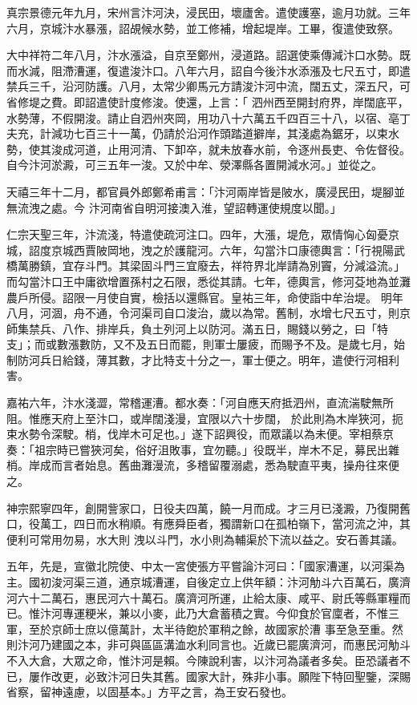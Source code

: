 \begin{pinyinscope}
 真宗景德元年九月，宋州言汴河決，浸民田，壞廬舍。遣使護塞，逾月功就。三年六月，京城汴水暴漲，詔覘候水勢，並工修補，增起堤岸。工畢，復遣使致祭。



 大中祥符二年八月，汴水漲溢，自京至鄭州，浸道路。詔選使乘傳減汴口水勢。既而水減，阻滯漕運，復遣浚汴口。八年六月，詔自今後汴水添漲及七尺五寸，即遣禁兵三千，沿河防護。八月，太常少卿馬元方請浚汴河中流，闊五丈，深五尺，可省修堤之費。即詔遣使計度修浚。使還，上言：「
 泗州西至開封府界，岸闊底平，水勢薄，不假開浚。請止自泗州夾岡，用功八十六萬五千四百三十八，以宿、亳丁夫充，計減功七百三十一萬，仍請於沿河作頭踏道擗岸，其淺處為鋸牙，以束水勢，使其浚成河道，止用河清、下卸卒，就未放春水前，令逐州長吏、令佐督役。自今汴河淤澱，可三五年一浚。又於中牟、滎澤縣各置開減水河。」並從之。



 天禧三年十二月，都官員外郎鄭希甫言：「汴河兩岸皆是陂水，廣浸民田，堤腳並無流洩之處。今
 汴河南省自明河接澳入淮，望詔轉運使規度以聞。」



 仁宗天聖三年，汴流淺，特遣使疏河注口。四年，大漲，堤危，眾情恟心匈憂京城，詔度京城西賈陂岡地，洩之於護龍河。六年，勾當汴口康德輿言：「行視陽武橋萬勝鎮，宜存斗門。其梁固斗門三宜廢去，祥符界北岸請為別竇，分減溢流。」而勾當汴口王中庸欲增置孫村之石限，悉從其請。七年，德輿言，修河芟地為並灘農戶所侵。詔限一月使自實，檢括以還縣官。皇祐三年，命使詣中牟治堤。
 明年八月，河涸，舟不通，令河渠司自口浚治，歲以為常。舊制，水增七尺五寸，則京師集禁兵、八作、排岸兵，負土列河上以防河。滿五日，賜錢以勞之，曰「特支」；而或數漲數防，又不及五日而罷，則軍士屢疲，而賜予不及。是歲七月，始制防河兵日給錢，薄其數，才比特支十分之一，軍士便之。明年，遣使行河相利害。



 嘉祐六年，汴水淺澀，常稽運漕。都水奏：「河自應天府抵泗州，直流湍駛無所阻。惟應天府上至汴口，或岸闊淺漫，宜限以六十步闊，
 於此則為木岸狹河，扼束水勢令深駛。梢，伐岸木可足也。」遂下詔興役，而眾議以為未便。宰相蔡京奏：「祖宗時已嘗狹河矣，俗好沮敗事，宜勿聽。」役既半，岸木不足，募民出雜梢。岸成而言者始息。舊曲灘漫流，多稽留覆溺處，悉為駛直平夷，操舟往來便之。



 神宗熙寧四年，創開訾家口，日役夫四萬，饒一月而成。才三月已淺澱，乃復開舊口，役萬工，四日而水稍順。有應舜臣者，獨謂新口在孤柏嶺下，當河流之沖，其便利可常用勿易，水大則
 洩以斗門，水小則為輔渠於下流以益之。安石善其議。



 五年，先是，宣徽北院使、中太一宮使張方平嘗論汴河曰：「國家漕運，以河渠為主。國初浚河渠三道，通京城漕運，自後定立上供年額：汴河觔斗六百萬石，廣濟河六十二萬石，惠民河六十萬石。廣濟河所運，止給太康、咸平、尉氏等縣軍糧而已。惟汴河專運粳米，兼以小麥，此乃大倉蓄積之實。今仰食於官廩者，不惟三軍，至於京師士庶以億萬計，太半待飽於軍稍之餘，故國家於漕
 事至急至重。然則汴河乃建國之本，非可與區區溝洫水利同言也。近歲已罷廣濟河，而惠民河觔斗不入大倉，大眾之命，惟汴河是賴。今陳說利害，以汴河為議者多矣。臣恐議者不已，屢作改更，必致汴河日失其舊。國家大計，殊非小事。願陛下特回聖鑒，深賜省察，留神遠慮，以固基本。」方平之言，為王安石發也。




\end{pinyinscope}
